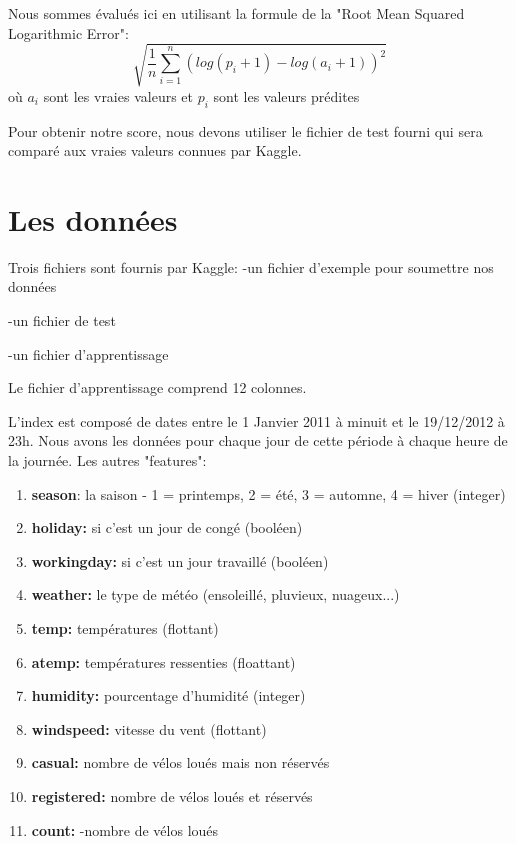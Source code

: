 \documentclass[a4paper,oneside,11pt]{article}
\begin{document}
Nous sommes évalués ici en utilisant la formule de la "Root Mean Squared Logarithmic Error":
\begin{equation*}
\sqrt{\frac{1}{n}\sum_{i=1}^{n}(log(p_i+1)-log(a_i+1))^2}
\end{equation*}
où $a_i$ sont les vraies valeurs et $p_i$ sont les valeurs prédites

Pour obtenir notre score, nous devons utiliser le fichier de test fourni qui sera comparé aux vraies valeurs connues par Kaggle.

\section*{Les données}
%

Trois fichiers sont fournis par Kaggle:
-un fichier d'exemple pour soumettre nos données

-un fichier de test

-un fichier d'apprentissage

Le fichier d'apprentissage comprend 12 colonnes. 

L'index est composé de dates entre le 1 Janvier 2011 à minuit et le 19/12/2012 à 23h. Nous avons les données pour chaque jour de cette période à chaque heure de la journée.
Les autres "features":
\begin{enumerate}
    \item \textbf{season}: la saison  -  1 = printemps, 2 = été, 3 = automne, 4 = hiver (integer) 
    \item \textbf{holiday:} si c'est un jour de congé (booléen)
    \item \textbf{workingday:} si c'est un jour travaillé (booléen) 
    \item \textbf{weather:} le type de météo (ensoleillé, pluvieux, nuageux...)
    \item \textbf{temp:} températures (flottant)
    \item \textbf{atemp:} températures ressenties (floattant)
    \item \textbf{humidity:} pourcentage d'humidité (integer)
    \item \textbf{windspeed:} vitesse du vent (flottant)
    \item \textbf{casual:} nombre de vélos loués mais non réservés
    \item \textbf{registered:} nombre de vélos loués et réservés
    \item \textbf{count:} -nombre de vélos loués
    \
\end{enumerate}
\end{document}
